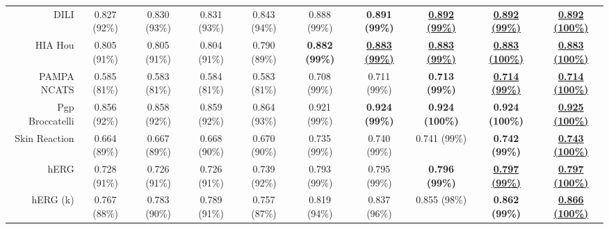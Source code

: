\begin{tabular}{r|cccccccc|c}
DILI & 0.827 \tiny (92\%) & 0.830 \tiny (93\%) & 0.831 \tiny (93\%) & 0.843 \tiny (94\%) & 0.888 \tiny (99\%) & \textbf{0.891 \tiny (99\%)} & \textbf{\underline{0.892 \tiny (99\%)}} & \textbf{\underline{0.892 \tiny (99\%)}} & \textbf{\underline{0.892 \tiny (100\%)}} \\
HIA Hou & 0.805 \tiny (91\%) & 0.805 \tiny (91\%) & 0.804 \tiny (91\%) & 0.790 \tiny (89\%) & \textbf{0.882 \tiny (99\%)} & \textbf{\underline{0.883 \tiny (99\%)}} & \textbf{\underline{0.883 \tiny (99\%)}} & \textbf{\underline{0.883 \tiny (100\%)}} & \textbf{\underline{0.883 \tiny (100\%)}} \\
PAMPA NCATS & 0.585 \tiny (81\%) & 0.583 \tiny (81\%) & 0.584 \tiny (81\%) & 0.583 \tiny (81\%) & 0.708 \tiny (99\%) & 0.711 \tiny (99\%) & \textbf{0.713 \tiny (99\%)} & \textbf{\underline{0.714 \tiny (99\%)}} & \textbf{\underline{0.714 \tiny (100\%)}} \\
Pgp Broccatelli & 0.856 \tiny (92\%) & 0.858 \tiny (92\%) & 0.859 \tiny (92\%) & 0.864 \tiny (93\%) & 0.921 \tiny (99\%) & \textbf{0.924 \tiny (99\%)} & \textbf{0.924 \tiny (100\%)} & \textbf{0.924 \tiny (100\%)} & \textbf{\underline{0.925 \tiny (100\%)}} \\
Skin  Reaction & 0.664 \tiny (89\%) & 0.667 \tiny (89\%) & 0.668 \tiny (90\%) & 0.670 \tiny (90\%) & 0.735 \tiny (99\%) & 0.740 \tiny (99\%) & 0.741 \tiny (99\%) & \textbf{0.742 \tiny (99\%)} & \textbf{\underline{0.743 \tiny (100\%)}} \\
hERG & 0.728 \tiny (91\%) & 0.726 \tiny (91\%) & 0.726 \tiny (91\%) & 0.739 \tiny (92\%) & 0.793 \tiny (99\%) & 0.795 \tiny (99\%) & \textbf{0.796 \tiny (99\%)} & \textbf{\underline{0.797 \tiny (99\%)}} & \textbf{\underline{0.797 \tiny (100\%)}} \\
hERG (k) & 0.767 \tiny (88\%) & 0.783 \tiny (90\%) & 0.789 \tiny (91\%) & 0.757 \tiny (87\%) & 0.819 \tiny (94\%) & 0.837 \tiny (96\%) & 0.855 \tiny (98\%) & \textbf{0.862 \tiny (99\%)} & \textbf{\underline{0.866 \tiny (100\%)}} \\
\end{tabular}
